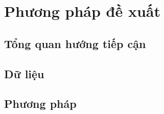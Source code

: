\chapter{Phương pháp đề xuất}
\label{chap:methodology}

\section{Tổng quan hướng tiếp cận}

\section{Dữ liệu}

\section{Phương pháp}
